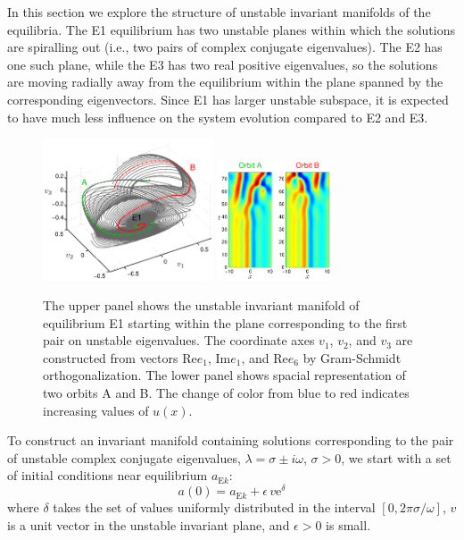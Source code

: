 In this section we explore the structure of unstable invariant
manifolds of the equilibria.  The E1 equilibrium has two unstable
planes within which the solutions are spiralling out (i.e., two
pairs of complex conjugate eigenvalues).  The E2 has one such plane,
while the E3 has two real positive eigenvalues, so the solutions are
moving radially away from the equilibrium within the plane spanned
by the corresponding eigenvectors.  Since E1 has larger unstable
subspace, it is expected to have much less influence on the system
evolution compared to E2 and E3.

\begin{figure}[h]\vspace*{-5pt} \centering
\includegraphics[width=0.45\textwidth]{figs/ks22_E1_plane1_manifold.eps}
\includegraphics[width=0.3\textwidth]{figs/ks22_E1_plane1_orbits.eps}
\vspace*{-5pt}\caption{ {\small The upper panel shows the unstable
invariant manifold of equilibrium E1 starting within the plane
corresponding to the first pair on unstable eigenvalues. The
coordinate axes $v_1$, $v_2$, and $v_3$ are constructed from vectors
$\mathrm{Re} e_1$, $\mathrm{Im} e_1$, and $\mathrm{Re} e_6$
by Gram-Schmidt orthogonalization.
The lower panel shows spacial representation of two orbits A and B.
The change of color from blue to red indicates increasing values of
$u(x)$.}} \label{f:KS22E1man1}\vspace*{-5pt}
\end{figure}

To construct an invariant manifold containing solutions
corresponding to the pair of unstable complex conjugate eigenvalues,
$\lambda = \sigma\pm i\omega$, $\sigma > 0$, we start with a set of
initial conditions near equilibrium $a_{\mathrm{E}k}$:
\[ a(0) = a_{\mathrm{E}k} + \epsilon\,v\mathrm{e}^{\delta}\]
where $\delta$ takes the set of values uniformly distributed in the
interval $[0,2\pi\sigma/\omega]$, $v$ is a unit vector in the
unstable invariant plane, and $\epsilon > 0$ is small.


